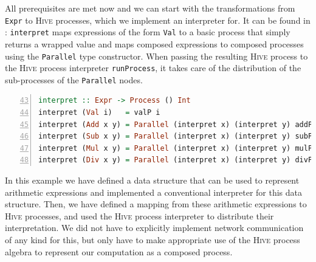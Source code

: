 All prerequisites are met now and we can start with the transformations from \texttt{Expr} to \textsc{Hive} processes, which we implement an interpreter for. It can be found in : \texttt{interpret} maps expressions of the form \texttt{Val} to a basic process that simply returns a wrapped value and maps composed expressions to composed processes using the \texttt{Parallel} type constructor. When passing the resulting \textsc{Hive} process to the \textsc{Hive} process interpreter \texttt{runProcess}, it takes care of the distribution of the sub-processes of the \texttt{Parallel} nodes.
\begin{lstlisting}[language=Haskell, caption=Transformation from \texttt{Expr} to \textsc{Hive} processes., label=lst:arith_transformation, numbers=left, frame=bt, firstnumber=43]
interpret :: Expr -> Process () Int
interpret (Val i)   = valP i
interpret (Add x y) = Parallel (interpret x) (interpret y) addP
interpret (Sub x y) = Parallel (interpret x) (interpret y) subP
interpret (Mul x y) = Parallel (interpret x) (interpret y) mulP
interpret (Div x y) = Parallel (interpret x) (interpret y) divP
\end{lstlisting}

In this example we have defined a data structure that can be used to represent arithmetic expressions and implemented a conventional interpreter for this data structure. Then, we have defined a mapping from these arithmetic expressions to \textsc{Hive} processes, and used the \textsc{Hive} process interpreter to distribute their interpretation. We did not have to explicitly implement network communication of any kind for this, but only have to make appropriate use of the \textsc{Hive} process algebra to represent our computation as a composed process. 